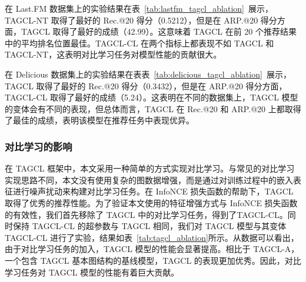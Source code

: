 \begin{table}[!h]
	\caption{TAGCL 消融实验}\label{tab:tagcl_ablation}
\end{table}

在 Last.FM 数据集上的实验结果在表~\ref{tab:lastfm_tagcl_ablation}~展示，TAGCL-NT 取得了最好的 Rec.@20 得分（0.5212），但是在 ARP.@20 得分方面，TAGCL 取得了最好的成绩（42.99）。这意味着 TAGCL 在前 20 个推荐结果中的平均排名位置最佳。TAGCL-CL 在两个指标上都表现不如 TAGCL 和 TAGCL-NT，这表明对比学习任务对模型性能的贡献很大。

在 Delicious 数据集上的实验结果在表表~\ref{tab:delicious_tagcl_ablation}~展示，TAGCL 取得了最好的 Rec.@20 得分（0.3432），但是在 ARP.@20 得分方面，TAGCL-CL 取得了最好的成绩（5.24）。这表明在不同的数据集上，TAGCL 模型的变体会有不同的表现，但总体而言，TAGCL 在 Rec.@20 和 ARP.@20 上都取得了最佳的成绩，表明该模型在推荐任务中表现优异。

\subsubsection{对比学习的影响}
在 TAGCL 框架中，本文采用一种简单的方式实现对比学习。与常见的对比学习实现思路不同，本文没有使用复杂的图数据增强，而是通过对训练过程中的嵌入表征进行噪声扰动来构建对比学习任务。在 InfoNCE 损失函数的帮助下，TAGCL 取得了优秀的推荐性能。为了验证本文使用的特征增强方式与 InfoNCE 损失函数的有效性，我们首先移除了 TAGCL 中的对比学习任务，得到了TAGCL-CL。同时保持 TAGCL-CL 的超参数与 TAGCL 相同，我们对 TAGCL 模型与其变体 TAGCL-CL 进行了实验，结果如表~\ref{tab:tagcl_ablation}所示。从数据可以看出，由于对比学习任务的加入，TAGCL 模型的性能会显著提高。相比于 TAGCL-A，一个包含 TAGCL 基本图结构的基线模型，TAGCL 的表现更加优秀。因此，对比学习任务对 TAGCL 模型的性能有着巨大贡献。

